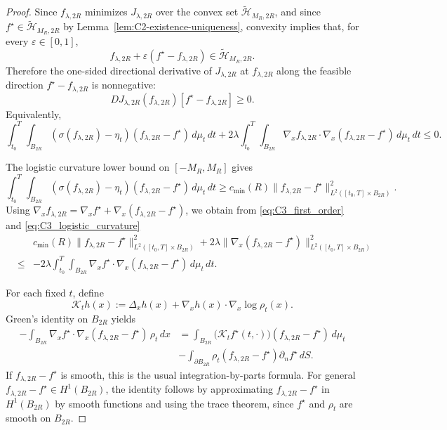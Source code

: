 \documentclass[11pt]{article}
\theoremstyle{plain}
\theoremstyle{definition}
\theoremstyle{remark}
\begin{document}
\begin{proof}
Since \(f_{\lambda,2R}\) minimizes \(J_{\lambda,2R}\) over the convex set
\(\widetilde{\mathcal H}_{M_R,2R}\), and since
\(f^\star\in\widetilde{\mathcal H}_{M_R,2R}\) by
Lemma~\ref{lem:C2-existence-uniqueness}, convexity implies that, for every
\(\varepsilon\in[0,1]\),
\[
f_{\lambda,2R}
+
\varepsilon(f^\star-f_{\lambda,2R})
\in
\widetilde{\mathcal H}_{M_R,2R}.
\]
Therefore the one-sided directional derivative of \(J_{\lambda,2R}\) at
\(f_{\lambda,2R}\) along the feasible direction
\(f^\star-f_{\lambda,2R}\) is nonnegative:
\[
DJ_{\lambda,2R}(f_{\lambda,2R})
[f^\star-f_{\lambda,2R}]
\ge 0.
\]
Equivalently,
\begin{equation}
\label{eq:C3_first_order}
\int_{t_0}^T\int_{B_{2R}}
(\sigma(f_{\lambda,2R})-\eta_t)(f_{\lambda,2R}-f^\star)\,d\mu_t\,dt
+
2\lambda
\int_{t_0}^T\int_{B_{2R}}
\nabla_x f_{\lambda,2R}\cdot\nabla_x(f_{\lambda,2R}-f^\star)\,d\mu_t\,dt
\le0.
\end{equation}

The logistic curvature lower bound on \([-M_R,M_R]\) gives
\begin{equation}
\label{eq:C3_logistic_curvature}
\int_{t_0}^T\int_{B_{2R}}
(\sigma(f_{\lambda,2R})-\eta_t)(f_{\lambda,2R}-f^\star)\,d\mu_t\,dt
\ge
c_{\min}(R)
\|f_{\lambda,2R}-f^\star\|_{L^2([t_0,T]\times B_{2R})}^2.
\end{equation}
Using
\(\nabla_x f_{\lambda,2R}
=\nabla_x f^\star+\nabla_x(f_{\lambda,2R}-f^\star)\), we obtain from
\eqref{eq:C3_first_order} and \eqref{eq:C3_logistic_curvature}
\begin{eqnarray}
\label{eq:C3_basic_energy}
&&c_{\min}(R)\|f_{\lambda,2R}-f^\star\|_{L^2([t_0,T]\times B_{2R})}^2
+
2\lambda\|\nabla_x(f_{\lambda,2R}-f^\star)\|_{L^2([t_0,T]\times B_{2R})}^2\nonumber\\
&\le&
-2\lambda
\int_{t_0}^T\int_{B_{2R}}
\nabla_x f^\star\cdot\nabla_x(f_{\lambda,2R}-f^\star)\,d\mu_t\,dt.
\end{eqnarray}

For each fixed \(t\), define
\[
\mathcal K_t h(x):=
\Delta_x h(x)
+
\nabla_x h(x)\cdot\nabla_x\log\rho_t(x).
\]
Green's identity on \(B_{2R}\) yields
\begin{equation}
\label{eq:C3_green_identity}
\begin{aligned}
    -\int_{B_{2R}}
\nabla_x f^\star\cdot\nabla_x(f_{\lambda,2R}-f^\star)\,\rho_t\,dx
&=
\int_{B_{2R}}
\bigl(\mathcal K_t f^\star(t,\cdot)\bigr)(f_{\lambda,2R}-f^\star)\,d\mu_t\\
&-
\int_{\partial B_{2R}}
\rho_t(f_{\lambda,2R}-f^\star)\partial_n f^\star\,dS.
\end{aligned}
\end{equation}
If \(f_{\lambda,2R}-f^\star\) is smooth, this is the usual
integration-by-parts formula. For general
\(f_{\lambda,2R}-f^\star\in H^1(B_{2R})\), the identity follows by
approximating \(f_{\lambda,2R}-f^\star\) in \(H^1(B_{2R})\) by smooth functions and
using the trace theorem, since \(f^\star\) and \(\rho_t\) are smooth on
\(B_{2R}\).


\end{proof}
\end{document}
